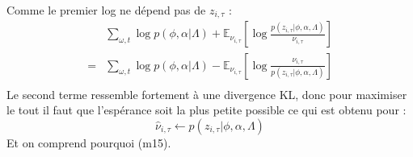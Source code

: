 \documentclass[a4paper,12pt]{article}
\begin{document}
Comme le premier log ne dépend pas de $z_{i,\tau}$ :
\begin{align*}
& \displaystyle\sum_{\omega,t} \log p(\phi, \alpha | \Lambda) + \mathbb{E}_{\nu_{i,\tau}} [\log \frac{p(z_{i, \tau} |\phi, \alpha, \Lambda)}{\nu_{i,\tau}}] \\
= & \displaystyle\sum_{\omega,t} \log p(\phi, \alpha | \Lambda) - \mathbb{E}_{\nu_{i,\tau}} [\log \frac{\nu_{i,\tau}}{p(z_{i, \tau} |\phi, \alpha, \Lambda)}] \\
\end{align*}
Le second terme ressemble fortement à une divergence KL, donc pour maximiser le tout il faut que l'espérance soit la plus petite possible ce qui est obtenu pour :
\begin{equation}
\hat\nu_{i,\tau} \leftarrow p(z_{i, \tau} |\phi, \alpha, \Lambda) \label{Estep}
\end{equation}
Et on comprend pourquoi (m15).
\end{document}
